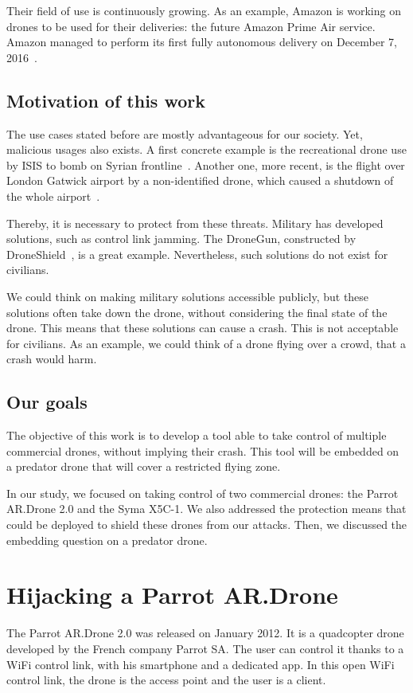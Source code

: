 \documentclass[conference,a4paper]{IEEEtran}
\begin{document}
Their field of use is continuously growing. As an example, Amazon is working on drones to
be used for their deliveries: the future Amazon Prime Air service. Amazon managed to
perform its first fully autonomous delivery on December 7, 2016~\cite{bib:amazon}.

\subsection{Motivation of this work}
The use cases stated before are mostly advantageous for our society. Yet, malicious usages
also exists. A first concrete example is the recreational drone use by ISIS to bomb on Syrian
frontline~\cite{bib:daesh}. Another one, more recent, is the flight over London Gatwick
airport by a non-identified drone, which caused a shutdown of the whole
airport~\cite{bib:gatwick}.

Thereby, it is necessary to protect from these threats. Military has developed solutions,
such as control link jamming. The DroneGun, constructed by
DroneShield~\cite{bib:droneshield}, is a great example. Nevertheless, such solutions
do not exist for civilians.

We could think on making military solutions accessible publicly, but these solutions often
take down the drone, without considering the final state of the drone. This means that
these solutions can cause a crash. This is not acceptable for civilians. As an example, we
could think of a drone flying over a crowd, that a crash would harm.

\subsection{Our goals}
The objective of this work is to develop a tool able to take control of multiple
commercial drones, without implying their crash. This tool will be embedded on a predator
drone that will cover a restricted flying zone.

In our study, we focused on taking control of two commercial drones: the Parrot AR.Drone
2.0 and the Syma X5C-1. We also addressed the protection means that could be deployed to
shield these drones from our attacks. Then, we discussed the embedding question on a
predator drone.



\section{Hijacking a Parrot AR.Drone}
The Parrot AR.Drone 2.0 was released on January 2012. It is a quadcopter drone developed
by the French company Parrot SA\@. The user can control it thanks to a WiFi control link,
with his smartphone and a dedicated app. In this open WiFi control link, the drone is the
access point and the user is a client.
\end{document}
